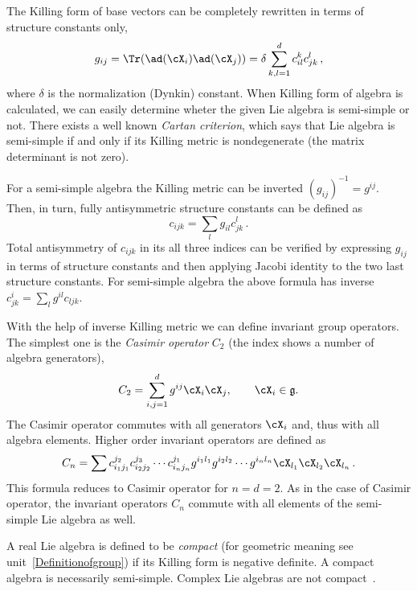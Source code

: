 \begin{unit}
The Killing form of base vectors can be completely rewritten in
terms of structure constants only,
\[
  g_{ij}=\Tr(\ad(\cX_i)\ad(\cX_j))= \delta\sum_{k,l=1}^d c_{il}^k
  c_{jk}^l\,,
\]
where $\delta$ is the normalization (Dynkin) constant. When Killing
form of algebra is calculated, we can easily determine wheter the given Lie algebra is semi-simple or not. 
There exists a well known {\it Cartan criterion}, which says that Lie
algebra is semi-simple if and only if its Killing metric is
nondegenerate (the matrix determinant is not zero).

For a semi-simple algebra the Killing metric can be inverted
$(g_{ij})^{-1}=g^{ij}$. Then, in turn, fully antisymmetric
structure constants can be defined as
\[
c_{ijk} =\sum_l g_{il}  c_{jk}^l\,.
\]
Total antisymmetry of $c_{ijk}$ in its all three indices can be
verified by expressing $g_{ij}$ in terms of structure constants
and then applying Jacobi identity to the two last structure
constants. For semi-simple algebra the above formula has
inverse $c_{jk}^i =\sum_l g^{il}  c_{ljk}$.

With the help of inverse Killing metric we can define invariant group
operators. The simplest one is the {\it Casimir
operator} $C_2$ (the index shows a number of algebra generators),
\[
  C_2 =\sum_{i,j=1}^d g^{ij}  \cX_i \cX_j,\qquad\cX_i\in\mathfrak{g}.
\]
The Casimir operator commutes with all generators $\cX_i$ and,
thus with all algebra elements. Higher order invariant operators
are defined as
\[
  C_n =\sum c_{i_1j_1}^{j_2} c_{i_2 j_2}^{j_3} \cdots c_{i_n j_n}^{j_1} g^{i_1l_1} g^{i_2l_2} \cdots g^{i_nl_n} \cX_{l_1} \cX_{l_2} \cX_{l_n}\,.
\]
This formula reduces to Casimir operator for $n=d=2$. As in the
case of Casimir operator, the invariant operators $C_n$ commute
with all elements of the semi-simple Lie algebra as well.

A real Lie algebra is defined to be {\it compact} (for geometric
meaning see unit~\ref{Definitionofgroup}) if its Killing form is
negative definite. A compact algebra is necessarily semi-simple.
Complex Lie algebras are not compact~\cite{Kirson}.

\end{unit}
